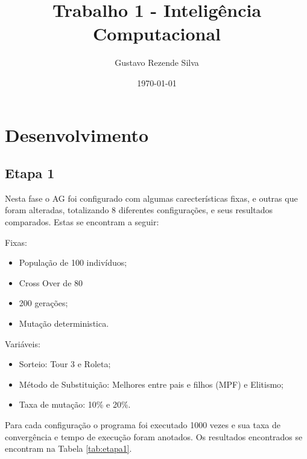 \documentclass[a4paper, 12pt]{article}
\title {Trabalho 1 - Inteligência Computacional}
\date{\today}
\author{Gustavo Rezende Silva}
\begin{document}
  \maketitle
  \newpage

  \section{Desenvolvimento}

  \subsection{Etapa 1}
    Nesta fase o AG foi configurado com algumas carecterísticas fixas,
    e outras que foram alteradas, totalizando 8 diferentes configurações,
    e seus resultados comparados. Estas se encontram a seguir:

    Fixas:
    \begin{itemize}
    \item População de 100 indivíduos;
    \item Cross Over de 80%
    \item 200 gerações;
    \item Mutação deterministica.
    \end{itemize}

    Variáveis:
    \begin{itemize}
    \item Sorteio: Tour 3 e Roleta;
    \item Método de Substituição: Melhores entre pais e filhos (MPF) e Elitismo;
    \item Taxa de mutação: 10\% e 20\%.
    \end{itemize}

    Para cada configuração o programa foi executado 1000 vezes e sua taxa de
     convergência e tempo de execução foram anotados. Os resultados encontrados
     se encontram na Tabela \ref{tab:etapa1}.
\end{document}
